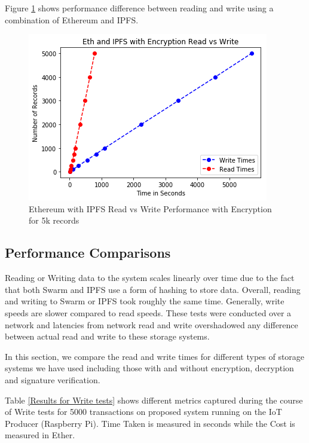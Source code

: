 \documentclass[11pt,openright]{report}
\begin{document}
Figure \ref{fig:graph_eth_ipfs_readvwrite_wencr} shows performance difference between reading and write using a combination of Ethereum and IPFS.
\begin{figure}
    \centering
    \includegraphics[scale=1]{results/graphs/Eth_IPFS_Read_v_Write_Encr.png}
    \caption{Ethereum with IPFS Read vs Write Performance with Encryption for 5k records}
    \label{fig:graph_eth_ipfs_readvwrite_wencr}
\end{figure}

\subsection{Performance Comparisons}
Reading or Writing data to the system scales linearly over time due to the fact that both Swarm and IPFS use a form of hashing to store data. Overall, reading and writing to Swarm or IPFS took roughly the same time. Generally, write speeds are slower compared to read speeds. These tests were conducted over a network and latencies from network read and write overshadowed any difference between actual read and write to these storage systems.

In this section, we compare the read and write times for different types of storage systems we have used including those with and without encryption, decryption and signature verification.

Table \ref{Results for Write tests} shows different metrics captured during the course of Write tests for 5000 transactions on proposed system running on the IoT Producer (Raspberry Pi). Time Taken is measured in seconds while the Cost is measured in Ether. 
\end{document}
